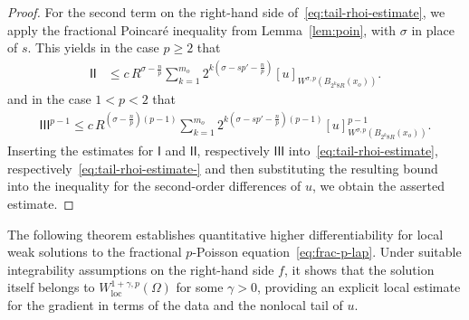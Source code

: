 \documentclass[10pt,letterpaper]{amsart}
\theoremstyle{definition}
\numberwithin{theorem}{section}
\numberwithin{equation}{section}
\newcommand{\1}{\ensuremath{\mathds{1}}}
\newcommand\sfI{{\boldsymbol{\mathsf I}}}
\numberwithin{equation}{section}
\begin{document}
\begin{proof}
For the second term on the right-hand side of~\eqref{eq:tail-rhoi-estimate}, 
we apply the fractional Poincaré inequality from Lemma~\ref{lem:poin}, 
with $\sigma$ in place of $s$. 
This yields in the case $p\ge 2$ that
\begin{align*}
    \sfI\sfI
    &\leq 
    c\, R^{\sigma- \frac{n}{p}} 
    \sum_{k=1}^{m_o} 2^{k(\sigma-sp' - \frac{n}{p})}  [u]_{W^{\sigma,p}(B_{2^k 8R}(x_o))}.
\end{align*}
and in the case $1<p<2$ that 
\begin{align*}
    \sfI\sfI\sfI^{p-1}
    \leq 
    c\, R^{(\sigma- \frac{n}{p})(p-1)} 
    \sum_{k=1}^{m_o} 2^{k(\sigma-sp' - \frac{n}{p})(p-1)}  [u]^{p-1}_{W^{\sigma,p}(B_{2^k 8R}(x_o))}.
\end{align*}
Inserting the estimates for $\sfI$ and $\sfI\sfI$, respectively $\sfI\sfI\sfI$ into~\eqref{eq:tail-rhoi-estimate}, respectively~\eqref{eq:tail-rhoi-estimate-}
and then substituting the resulting bound into the inequality for the second-order differences of $u$, 
we obtain the asserted estimate.
\end{proof}


The following theorem establishes quantitative higher differentiability for local weak solutions to the fractional $p$-Poisson equation~\eqref{eq:frac-p-lap}. 
Under suitable integrability assumptions on the right-hand side $f$, 
it shows that the solution itself belongs to $W^{1+\gamma,p}_{\mathrm{loc}}(\Omega)$ for some $\gamma>0$, 
providing an explicit local estimate for the gradient in terms of the data and the nonlocal tail of $u$.
\end{document}
